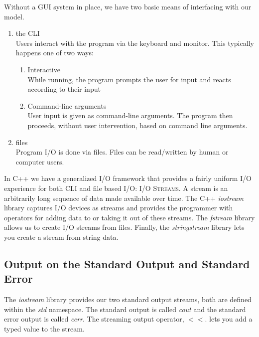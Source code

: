 \documentclass[]{tufte-handout}
\begin{document}
Without a GUI system in place, we have two basic means of interfacing with our model. 
\begin{enumerate}
\item the CLI \\
Users interact with the program via the keyboard and monitor. This typically happens one of two ways:
\begin{enumerate}
\item Interactive \\
While running, the program prompts the user for input and reacts according to their input
\item Command-line arguments\\
User input is given as command-line arguments. The program then proceeds, without user intervention, based on command line arguments.
\end{enumerate}
\item files \\
Program I/O is done via files. Files can be read/written by human or computer users. 
\end{enumerate}

In C++ we have a generalized I/O framework that provides a fairly uniform I/O experience for both CLI and file based I/O: \textsc{I/O Streams}. A stream is an arbitrarily long sequence of data made available over time.  The C++ \textit{iostream} library captures I/O devices as streams and provides the programmer with operators for adding data to or taking it out of these streams.  The \textit{fstream} library allows us to create I/O streams from files.  Finally, the \textit{stringstream} library lets you create a stream from string data.  

\subsection{Output on the Standard Output and Standard Error}

The \textit{iostream} library provides our two standard output streams, both are defined within the \textit{std} namespace. The standard output is called \textit{cout} and the standard error output is called \textit{cerr}. The streaming output operator, $<<$. lets you add a typed value to the stream. 
\end{document}
